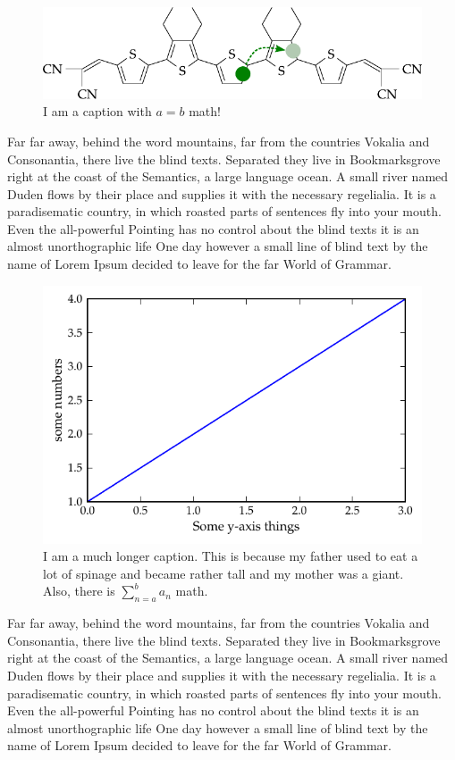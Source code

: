 \begin{figure}[htbp]
  \centering
  \includegraphics[width=\textwidth]{inhalt/abbildungen/molecule.pdf}
  \caption{I am a caption with $a=b$ math!}
  \label{fig:bla}
\end{figure}

Far far away, behind the word mountains, far from the countries Vokalia and
Consonantia, there live the blind texts. Separated they live in
Bookmarksgrove right at the coast of the Semantics, a large language
ocean. A small river named Duden flows by their place and supplies it with
the necessary regelialia. It is a paradisematic country, in which roasted
parts of sentences fly into your mouth. Even the all-powerful Pointing has
no control about the blind texts it is an almost unorthographic life One
day however a small line of blind text by the name of Lorem Ipsum decided
to leave for the far World of Grammar.

\begin{figure}[htbp]
  \centering
  \includegraphics[width=\textwidth]{inhalt/abbildungen/example.pdf}
  \caption{I am a much longer caption. This is because my father used to
    eat a lot of spinage and became rather tall and my mother was a
    giant. Also, there is $\sum^b_{n=a} a_n$ math.}
  \label{fig:bla2}
\end{figure}

Far far away, behind the word mountains, far from the countries Vokalia and
Consonantia, there live the blind texts. Separated they live in
Bookmarksgrove right at the coast of the Semantics, a large language
ocean. A small river named Duden flows by their place and supplies it with
the necessary regelialia. It is a paradisematic country, in which roasted
parts of sentences fly into your mouth. Even the all-powerful Pointing has
no control about the blind texts it is an almost unorthographic life One
day however a small line of blind text by the name of Lorem Ipsum decided
to leave for the far World of Grammar.
